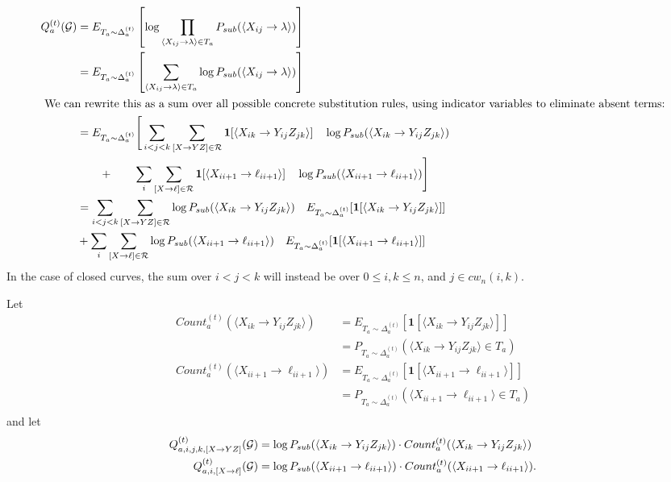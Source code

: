 \documentclass{article}
\def\ind{\mathbf{1}}
\begin{document}
\begin{align*}
  Q_a^{(t)}(\GGG) &=
E_{T_a \sim \Delta_a^{(t)}}\left[\log
    \prod_{\langle X_{ij} \to \lambda\rangle \in T_a} P_{sub}(\langle
    X_{ij} \to \lambda\rangle)\right]\\
&=
E_{T_a \sim \Delta_a^{(t)}}\left[
    \sum_{\langle X_{ij} \to \lambda\rangle \in T_a} \log P_{sub}(\langle
    X_{ij} \to \lambda\rangle)\right]\\
\intertext{
We can rewrite this as a sum over all possible concrete
  substitution rules, using indicator variables to eliminate absent terms:}
&=
E_{T_a \sim \Delta_a^{(t)}}\Bigg[
\sum_{i < j < k} \sum_{[X\to YZ]\in \RRR}\ind [ 
\langle X_{ik}
\to Y_{ij} Z_{jk} \rangle] \quad \log P_{sub}(\langle X_{ik} \to Y_{ij}
Z_{jk}\rangle )\\
&\qquad+\qquad \sum_{i} \sum_{[X\to \ell]\in \RRR}\ind [ \langle X_{i i+1}
\to \ell_{i i+1} \rangle] \quad \log P_{sub}(\langle X_{i i+1} \to \ell_{i i+1}\rangle)
\Bigg]\\
&=
\sum_{i < j < k} \sum_{[X\to YZ]\in \RRR} \log P_{sub}(\langle X_{ik} \to Y_{ij}
Z_{jk}\rangle ) \quad E_{T_a \sim \Delta_a^{(t)}}[\ind [ 
\langle X_{ik}
\to Y_{ij} Z_{jk} \rangle]]\\
&+ \sum_{i} \sum_{[X\to \ell]\in \RRR}
\log P_{sub}(\langle X_{i i+1} \to \ell_{i i+1}\rangle)
\quad E_{T_a \sim \Delta_a^{(t)}}[\ind [ \langle X_{i i+1}
\to \ell_{i i+1} \rangle]] 
\end{align*}
In the case of closed curves, the sum over $i < j < k$ will instead be
over $0\le i,k \le n$, and $j\in cw_n(i,k)$.

Let 
\begin{align*}
  Count_a^{(t)}(\langle X_{ik} \to Y_{ij} Z_{jk} \rangle) &=  E_{T_a \sim \Delta_a^{(t)}}[\ind [ 
\langle X_{ik}
\to Y_{ij} Z_{jk} \rangle]]\\
&= P_{T_a \sim \Delta_a^{(t)}}( \langle X_{ik} \to Y_{ij} Z_{jk}
\rangle \in T_a)\\
Count_a^{(t)}(\langle X_{ii+1} \to \ell_{i i+1} \rangle) &=
E_{T_a \sim \Delta_a^{(t)}}[\ind [ \langle X_{i i+1}
\to \ell_{i i+1} \rangle]] \\
&= P_{T_a \sim \Delta_a^{(t)}}( \langle X_{i i+1} \to \ell_{i i+1} \rangle \in T_a)\\
\end{align*}
and let
\begin{align*}
  Q^{(t)}_{a,i,j,k,[X\to YZ]}({\mathcal G}) &= 
\log P_{sub}(\langle X_{ik} \to Y_{ij}
Z_{jk}\rangle ) \cdot   Count_a^{(t)}(\langle X_{ik} \to Y_{ij} Z_{jk} \rangle)\\
Q^{(t)}_{a,i,[X\to \ell]}({\mathcal G}) &=
\log P_{sub}(\langle X_{i i+1} \to \ell_{i i+1}\rangle)
\cdot Count_a^{(t)}(\langle X_{ii+1} \to \ell_{i i+1} \rangle).
\end{align*}
\end{document}
